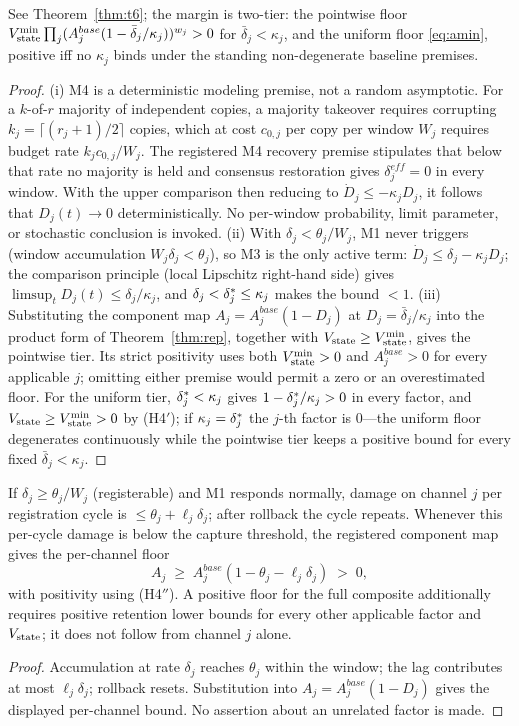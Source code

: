 \begin{theorem}
See Theorem~\ref{thm:t6}; the margin is two-tier: the pointwise floor
$V_{\mathrm{state}}^{\min}\prod_j(A_j^{base}(1-\bar\delta_j/\kappa_j))^{w_j}>0$ for
$\bar\delta_j<\kappa_j$, and the uniform floor \eqref{eq:amin}, positive iff
no $\kappa_j$ binds under the standing non-degenerate baseline premises.
\end{theorem}
\begin{proof}
(i) M4 is a deterministic modeling premise, not a random asymptotic. For a
$k$-of-$r$ majority of independent copies, a majority takeover requires
corrupting $k_j=\lceil(r_j+1)/2\rceil$ copies, which at cost $c_{0,j}$ per
copy per window $W_j$ requires budget rate $k_jc_{0,j}/W_j$. The registered
M4 recovery premise stipulates that below that rate no majority is held and
consensus restoration gives $\delta_j^{eff}=0$ in every window. With the
upper comparison then reducing to $\dot D_j\le-\kappa_jD_j$, it follows that
$D_j(t)\to0$ deterministically. No per-window probability, limit parameter,
or stochastic conclusion is invoked.
(ii) With $\delta_j<\theta_j/W_j$, M1 never triggers (window accumulation
$W_j\delta_j<\theta_j$), so M3 is the only active term:
$\dot D_j\le\delta_j-\kappa_jD_j$; the comparison principle (local Lipschitz
right-hand side) gives $\limsup_tD_j(t)\le\delta_j/\kappa_j$, and
$\delta_j<\delta^{*}_j\le\kappa_j$ makes the bound $<1$.
(iii) Substituting the component map $A_j=A_j^{base}(1-D_j)$ at
$D_j=\bar\delta_j/\kappa_j$ into the product form of
Theorem~\ref{thm:rep}, together with $V_{\mathrm{state}}\ge V_{\mathrm{state}}^{\min}$, gives the
pointwise tier. Its strict positivity uses both $V_{\mathrm{state}}^{\min}>0$ and
$A_j^{base}>0$ for every applicable $j$; omitting either premise would permit
a zero or an overestimated floor. For the uniform tier,
$\delta^{*}_j<\kappa_j$ gives $1-\delta^{*}_j/\kappa_j>0$ in every factor,
and $V_{\mathrm{state}}\ge V_{\mathrm{state}}^{\min}>0$ by (H4$'$); if $\kappa_j=\delta^{*}_j$ the
$j$-th factor is $0$---the uniform floor degenerates continuously while the
pointwise tier keeps a positive bound for every fixed
$\bar\delta_j<\kappa_j$.
\end{proof}

\begin{proposition}
If $\delta_j\ge\theta_j/W_j$ (registerable) and M1 responds normally, damage
on channel $j$ per registration cycle is $\le\theta_j+\ell_j\delta_j$; after
rollback the cycle repeats. Whenever this per-cycle damage is below the
capture threshold, the registered component map gives the per-channel floor
\[
A_j\;\ge\;A_j^{base}(1-\theta_j-\ell_j\delta_j)\;>\;0,
\]
with positivity using \textup{(H4$''$)}. A positive floor for the full
composite additionally requires positive retention lower bounds for every
other applicable factor and $V_{\mathrm{state}}$; it does not follow from channel $j$
alone.
\end{proposition}
\begin{proof}
Accumulation at rate $\delta_j$ reaches $\theta_j$ within the window; the lag
contributes at most $\ell_j\delta_j$; rollback resets. Substitution into
$A_j=A_j^{base}(1-D_j)$ gives the displayed per-channel bound. No assertion
about an unrelated factor is made.
\end{proof}


